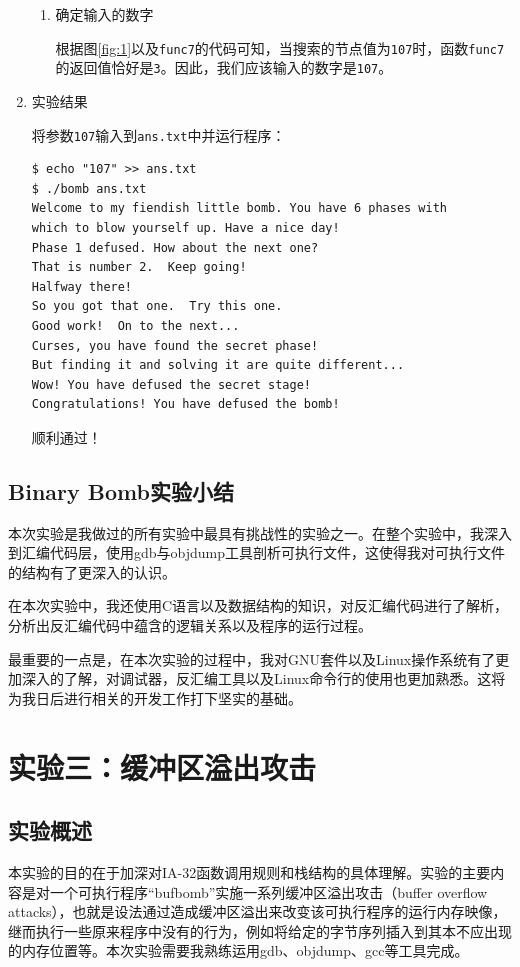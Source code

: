 \documentclass{paper}
\begin{document}
\begin{enumerate}
\begin{enumerate}
\item 确定输入的数字

根据图\ref{fig:1}以及\verb|func7|的代码可知，当搜索的节点值为\verb|107|时，函数\verb|func7|的返回值恰好是\verb|3|。因此，我们应该输入的数字是\verb|107|。

\end{enumerate}

\item 实验结果

将参数\verb|107|输入到\verb|ans.txt|中并运行程序：
\begin{lstlisting}
$ echo "107" >> ans.txt
$ ./bomb ans.txt
Welcome to my fiendish little bomb. You have 6 phases with
which to blow yourself up. Have a nice day!
Phase 1 defused. How about the next one?
That is number 2.  Keep going!
Halfway there!
So you got that one.  Try this one.
Good work!  On to the next...
Curses, you have found the secret phase!
But finding it and solving it are quite different...
Wow! You have defused the secret stage!
Congratulations! You have defused the bomb!
\end{lstlisting}
顺利通过！

\end{enumerate}

\subsection{Binary Bomb实验小结}

本次实验是我做过的所有实验中最具有挑战性的实验之一。在整个实验中，我深入到汇编代码层，使用gdb与objdump工具剖析可执行文件，这使得我对可执行文件的结构有了更深入的认识。

在本次实验中，我还使用C语言以及数据结构的知识，对反汇编代码进行了解析，分析出反汇编代码中蕴含的逻辑关系以及程序的运行过程。

最重要的一点是，在本次实验的过程中，我对GNU套件以及Linux操作系统有了更加深入的了解，对调试器，反汇编工具以及Linux命令行的使用也更加熟悉。这将为我日后进行相关的开发工作打下坚实的基础。
\newpage

\section{实验三：缓冲区溢出攻击}

\subsection{实验概述}

本实验的目的在于加深对IA-32函数调用规则和栈结构的具体理解。实验的主要内容是对一个可执行程序“bufbomb”实施一系列缓冲区溢出攻击（buffer overflow attacks），也就是设法通过造成缓冲区溢出来改变该可执行程序的运行内存映像，继而执行一些原来程序中没有的行为，例如将给定的字节序列插入到其本不应出现的内存位置等。本次实验需要我熟练运用gdb、objdump、gcc等工具完成。
\end{document}
